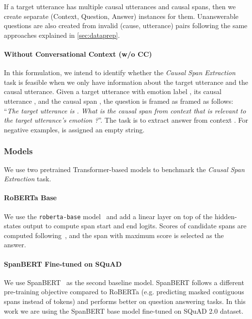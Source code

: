 \documentclass[smallextended]{svjour3}
\newcommand\code[1]{\texttt{#1}}
\newcommand\0{\hphantom{0}}
\begin{document}
If a target utterance has multiple causal utterances and causal spans, then we create separate (Context, Question, Answer) instances for them. Unanswerable questions are also created from invalid (cause, utterance) pairs following the same approaches explained in \cref{sec:dataprep}. 

\paragraph{Without Conversational Context (w/o CC)}
In this formulation, we intend to identify whether the \textit{Causal Span Extraction} task is feasible when we only have information about the target utterance and the causal utterance. Given a target utterance  with emotion label , its causal utterance 
, and the causal span , the question is framed as framed as follows: ``\textit{The target utterance is . What is the causal span from context that is relevant to the target utterance's emotion ?}''. The task is to extract answer  from context . For negative examples,  is assigned an empty string.

\subsubsection{Models}
We use 
two pretrained Transformer-based models to benchmark the \textit{Causal Span Extraction} task.


\paragraph{{RoBERTa Base}} We use the \code{roberta-base}
model~\cite{liu2019roberta} and add a linear layer on top of the hidden-states output to compute span start and end logits. Scores of candidate spans are computed following~\citet{devlin2018bert}, and the span with maximum score is selected as the answer.


\paragraph{{SpanBERT Fine-tuned on SQuAD}} We use SpanBERT~\citep{joshi2020spanbert} as the second baseline model. 
SpanBERT follows a different pre-training objective compared to RoBERTa (e.g. predicting masked contiguous spans instead of tokens) and performs better on question answering tasks. 
In this work we are using the SpanBERT base model fine-tuned on SQuAD 2.0 dataset.
\end{document}
